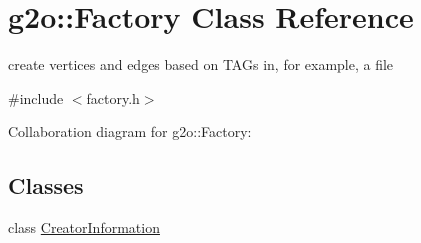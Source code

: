 \hypertarget{classg2o_1_1Factory}{}\section{g2o\+:\+:Factory Class Reference}
\label{classg2o_1_1Factory}


create vertices and edges based on T\+A\+Gs in, for example, a file  




{\ttfamily \#include $<$factory.\+h$>$}



Collaboration diagram for g2o\+:\+:Factory\+:
\subsection*{Classes}
\begin{DoxyCompactItemize}
\item 
class \hyperlink{classg2o_1_1Factory_1_1CreatorInformation}{Creator\+Information}
\end{DoxyCompactItemize}
